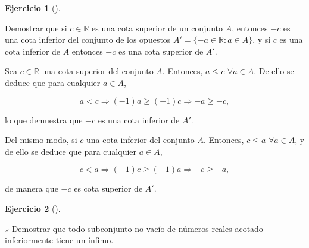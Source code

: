 \documentclass[
  a4paper,
]{scrreport}
\theoremstyle{definition}
\newtheorem{exercise}{Ejercicio}[chapter]
\theoremstyle{remark}
\begin{document}
\leavevmode{}%
\begin{exercise}[]\label{exr-cotas-conjunto-opuestos}

Demostrar que si \(c\in\mathbb{R}\) es una cota superior de un conjunto
\(A\), entonces \(-c\) es una cota inferior del conjunto de los opuestos
\(A'=\{-a\in\mathbb{R}: a\in A\}\), y si \(c\) es una cota inferior de
\(A\) entonces \(-c\) es una cota superior de \(A'\).

\end{exercise}

\begin{tcolorbox}[enhanced jigsaw, left=2mm, arc=.35mm, coltitle=black, toprule=.15mm, colback=white, breakable, bottomrule=.15mm, colbacktitle=quarto-callout-tip-color!10!white, bottomtitle=1mm, toptitle=1mm, opacityback=0, titlerule=0mm, opacitybacktitle=0.6, title=\textcolor{quarto-callout-tip-color}{\faLightbulb}\hspace{0.5em}{Solución}, rightrule=.15mm, leftrule=.75mm, colframe=quarto-callout-tip-color-frame]

Sea \(c\in\mathbb{R}\) una cota superior del conjunto \(A\). Entonces,
\(a\leq c\) \(\forall a\in A\). De ello se deduce que para cualquier
\(a\in A\),

\[
a<c \Rightarrow (-1)a\geq (-1)c \Rightarrow -a\geq -c, 
\]

lo que demuestra que \(-c\) es una cota inferior de \(A'\).

Del mismo modo, si \(c\) una cota inferior del conjunto \(A\). Entonces,
\(c\leq a\) \(\forall a\in A\), y de ello se deduce que para cualquier
\(a\in A\),

\[
c<a \Rightarrow (-1)c\geq (-1)a \Rightarrow -c\geq -a, 
\]

de manera que \(-c\) es cota superior de \(A'\).

\end{tcolorbox}

\leavevmode{}%
\begin{exercise}[]\label{exr-propiedad-infimo}

\(\star\) Demostrar que todo subconjunto no vacío de números reales
acotado inferiormente tiene un ínfimo.

\end{exercise}
\end{document}
